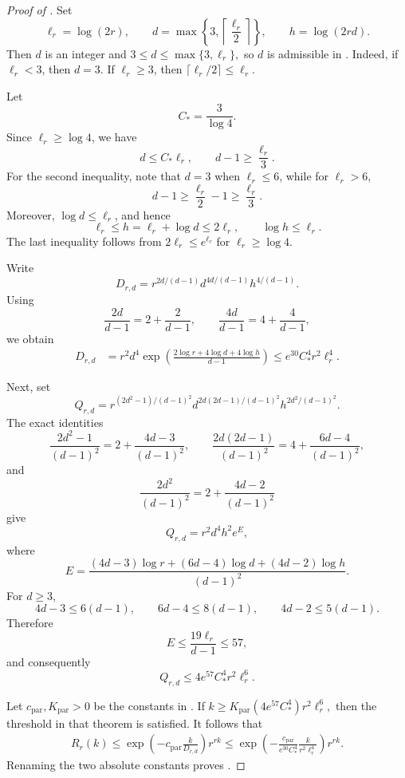 \documentclass[twoside,12pt]{article}
\theoremstyle{definition}
\theoremstyle{remark}
\newcommand{\1}{\mathbf 1}
\begin{document}
\begin{proof}[Proof of ]
Set
\[
 \ell_r=\log(2r),
 \qquad
 d=\max\left\{3,\left\lceil\frac{\ell_r}{2}\right\rceil\right\},
 \qquad
 h=\log(2rd).
\]
Then $d$ is an integer and
$
 3\le d\le\max\{3,\ell_r\},
$
so $d$ is admissible in . Indeed, if
$\ell_r<3$, then $d=3$. If $\ell_r\ge3$, then
$\lceil\ell_r/2\rceil\le\ell_r$.

Let
\[
 C_*=\frac3{\log4}.
\]
Since $\ell_r\ge\log4$, we have
\[
 d\le C_*\ell_r,
 \qquad
 d-1\ge\frac{\ell_r}{3}.
\]
For the second inequality, note that $d=3$ when $\ell_r\le6$, while for
$\ell_r>6$,
\[
 d-1\ge\frac{\ell_r}{2}-1\ge\frac{\ell_r}{3}.
\]
Moreover, $\log d\le\ell_r$, and hence
\[
 \ell_r\le h=\ell_r+\log d\le2\ell_r,
 \qquad
 \log h\le\ell_r.
\]
The last inequality follows from $2\ell_r\le e^{\ell_r}$ for
$\ell_r\ge\log4$.

Write
\[
 D_{r,d}=
 r^{2d/(d-1)}d^{4d/(d-1)}h^{4/(d-1)}.
\]
Using
\[
 \frac{2d}{d-1}=2+\frac2{d-1},
 \qquad
 \frac{4d}{d-1}=4+\frac4{d-1},
\]
we obtain
\begin{align*}
 D_{r,d}
 &=r^2d^4
 \exp\!\left(
 \frac{2\log r+4\log d+4\log h}{d-1}
 \right)\le e^{30}C_*^4r^2\ell_r^4.
\end{align*}

Next, set
\[
 Q_{r,d}=
 r^{(2d^2-1)/(d-1)^2}
 d^{2d(2d-1)/(d-1)^2}
 h^{2d^2/(d-1)^2}.
\]
The exact identities
\[
 \frac{2d^2-1}{(d-1)^2}
 =2+\frac{4d-3}{(d-1)^2},
 \qquad
 \frac{2d(2d-1)}{(d-1)^2}
 =4+\frac{6d-4}{(d-1)^2},
\]
and
\[
 \frac{2d^2}{(d-1)^2}
 =2+\frac{4d-2}{(d-1)^2}
\]
give
\[
 Q_{r,d}=r^2d^4h^2e^E,
\]
where
\[
 E=
 \frac{(4d-3)\log r+(6d-4)\log d+(4d-2)\log h}
 {(d-1)^2}.
\]
For $d\ge3$,
\[
 4d-3\le6(d-1),
 \qquad
 6d-4\le8(d-1),
 \qquad
 4d-2\le5(d-1).
\]
Therefore
\[
 E\le\frac{19\ell_r}{d-1}\le57,
\]
and consequently
\[
 Q_{r,d}\le4e^{57}C_*^4r^2\ell_r^6.
\]

Let $c_{\mathrm{par}},K_{\mathrm{par}}>0$ be the constants in
. If
$
 k\ge K_{\mathrm{par}}(4e^{57}C_*^4)r^2\ell_r^6,
$
then the threshold in that theorem is satisfied. It follows that
\begin{align*}
 R_r(k)
 \le\exp\!\left(-c_{\mathrm{par}}\frac{k}{D_{r,d}}\right)r^{rk}\le\exp\!\left(
 -\frac{c_{\mathrm{par}}}{e^{30}C_*^4}
 \frac{k}{r^2\ell_r^4}
 \right)r^{rk}.
\end{align*}
Renaming the two absolute constants proves .
\end{proof}
\end{document}
